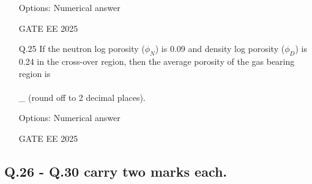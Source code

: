 \documentclass{article}
\begin{document}
\begin{enumerate}[leftmargin=*,series=q]
Options: Numerical answer

GATE EE 2025
 \vspace{0.5cm} 
\item[Q.25] If the neutron log porosity ($\phi_N$) is 0.09 and density log porosity ($\phi_D$) is 0.24 in the cross-over region, then the average porosity of the gas bearing region is \\\\\_ (round off to 2 decimal places).

Options: Numerical answer

GATE EE 2025
\end{enumerate}
 \vspace{0.5cm} 
\subsection*{Q.26 - Q.30 carry two marks each.}
\end{document}
